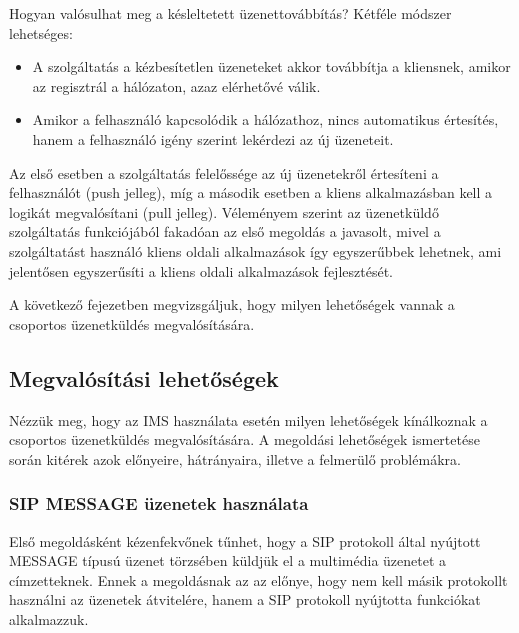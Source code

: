 Hogyan valósulhat meg a késleltetett üzenettovábbítás? Kétféle módszer lehetséges:

\begin{itemize}\itemsep1pt
\item	A szolgáltatás a kézbesítetlen üzeneteket akkor továbbítja a kliensnek, amikor az regisztrál a hálózaton, azaz elérhetővé válik.
\item Amikor a felhasználó kapcsolódik a hálózathoz, nincs automatikus értesítés, hanem a felhasználó igény szerint lekérdezi az új üzeneteit.
\end{itemize} 

Az első esetben a szolgáltatás felelőssége az új üzenetekről értesíteni a felhasználót (push jelleg), míg a második esetben a kliens alkalmazásban kell a logikát megvalósítani (pull jelleg). Véleményem szerint az üzenetküldő szolgáltatás funkciójából fakadóan az első megoldás a javasolt, mivel a szolgáltatást használó kliens oldali alkalmazások így egyszerűbbek lehetnek, ami jelentősen egyszerűsíti a kliens oldali alkalmazások fejlesztését.

A következő fejezetben megvizsgáljuk, hogy milyen lehetőségek vannak a csoportos üzenetküldés megvalósítására.

\subsection{Megvalósítási lehetőségek}

Nézzük meg, hogy az IMS használata esetén milyen lehetőségek kínálkoznak a csoportos üzenetküldés megvalósítására. A megoldási lehetőségek ismertetése során kitérek azok előnyeire, hátrányaira, illetve a felmerülő problémákra.

\subsubsection{SIP MESSAGE üzenetek használata}
\label{sec:sip_message}

Első megoldásként kézenfekvőnek tűnhet, hogy a SIP protokoll által nyújtott MESSAGE típusú üzenet törzsében küldjük el a multimédia üzenetet a címzetteknek. Ennek a megoldásnak az az előnye, hogy nem kell másik protokollt használni az üzenetek átvitelére, hanem a SIP protokoll nyújtotta funkciókat alkalmazzuk. 


